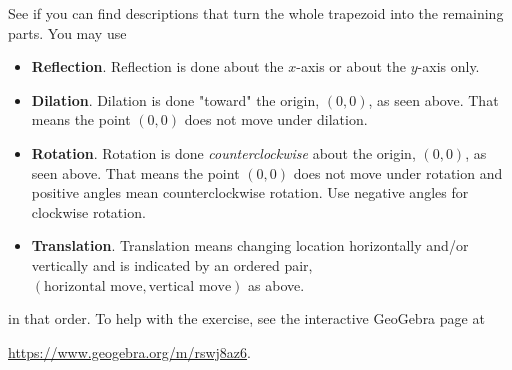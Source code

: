 See if you can find descriptions that turn the whole trapezoid into the remaining parts. You may use
\begin{itemize}
    \item \textbf{Reflection}. Reflection is done about the $x$-axis or about the $y$-axis only.
    \item \textbf{Dilation}. Dilation is done "toward" the origin, $(0,0)$, as seen above. That means the point $(0,0)$ does not move under dilation.
    \item \textbf{Rotation}. Rotation is done \textit{counterclockwise} about the origin, $(0,0)$, as seen above. That means the point $(0,0)$ does not move under rotation and positive angles mean counterclockwise rotation. Use negative angles for clockwise rotation.
    \item \textbf{Translation}. Translation means changing location horizontally and/or vertically and is indicated by an ordered pair, $(\text{horizontal move},\text{vertical move})$ as above.
\end{itemize}
in that order. To help with the exercise, see the interactive GeoGebra page at 
\begin{center}\url{https://www.geogebra.org/m/rswj8az6}.\end{center}
